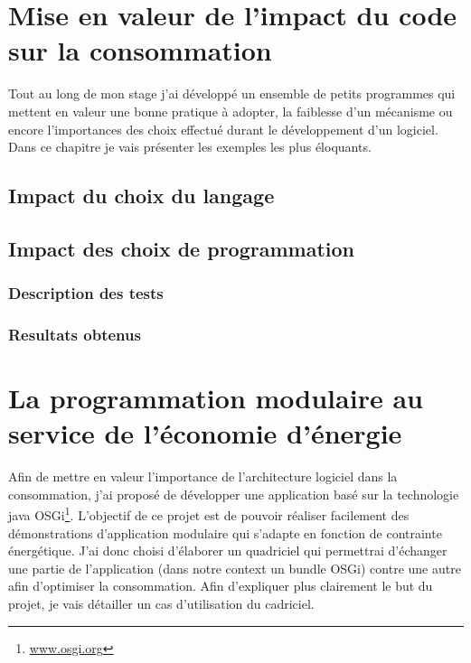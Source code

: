 \documentclass[a4paper, 11pt]{report}
\begin{document}
\chapter{Mise en valeur de l'impact du code sur la consommation}
Tout au long de mon stage j'ai développé un ensemble de petits programmes qui mettent en valeur une bonne pratique à adopter, la faiblesse d'un mécanisme ou encore l'importances des choix effectué durant le développement d'un logiciel. Dans ce chapitre je vais présenter les exemples les plus éloquants. 
	\section{Impact du choix du langage}
	\section{Impact des choix de programmation}
		\subsection{Description des tests}
		\subsection{Resultats obtenus}

\chapter{La programmation modulaire au service de l'économie d'énergie}
Afin de mettre en valeur l'importance de l'architecture logiciel dans la consommation, j'ai proposé de développer une application basé sur la technologie java OSGi\footnote{\href{http://www.osgi.org}{www.osgi.org}}. L'objectif de ce projet est de pouvoir réaliser facilement des démonstrations d'application modulaire qui s'adapte en fonction de contrainte énergétique. J'ai donc choisi d'élaborer un quadriciel qui permettrai d'échanger une partie de l'application (dans notre context un bundle OSGi) contre une autre afin d'optimiser la consommation. Afin d'expliquer plus clairement le but du projet, je vais détailler un cas d'utilisation du cadriciel.
\end{document}
